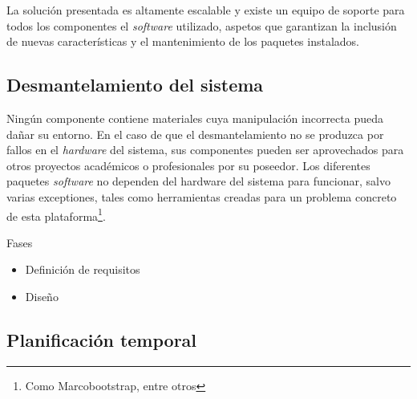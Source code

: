 La solución presentada es altamente escalable y existe un equipo de soporte para todos los componentes el \textit{software} utilizado, aspetos que garantizan la inclusión de nuevas características y el mantenimiento de los paquetes instalados.  

\subsection{Desmantelamiento del sistema}

Ningún componente contiene materiales cuya manipulación incorrecta pueda dañar su entorno. En el caso de que el desmantelamiento no se produzca por fallos en el \textit{hardware} del sistema, sus componentes pueden ser aprovechados para otros proyectos académicos o profesionales por su poseedor. Los diferentes paquetes \textit{software} no dependen del hardware del sistema para funcionar, salvo varias exceptiones, tales como herramientas creadas para un problema concreto de esta plataforma\footnote{Como Marcobootstrap, entre otros}.

Fases
\begin{itemize}
  \item Definición de requisitos
  \item Diseño
\end{itemize}




\subsection{Planificación temporal}
\citationneeded[]
% 
% 
% 
% 
% 
% 
% 

